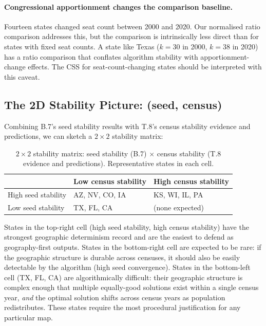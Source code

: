 \paragraph{Congressional apportionment changes the comparison baseline.}
Fourteen states changed seat count between 2000 and 2020.
Our normalised ratio comparison addresses this, but the comparison is
intrinsically less direct than for states with fixed seat counts.
A state like Texas ($k=30$ in 2000, $k=38$ in 2020) has a ratio comparison
that conflates algorithm stability with apportionment-change effects.
The CSS for seat-count-changing states should be interpreted with this caveat.

\subsection{The 2D Stability Picture: (seed, census)}

Combining B.7's seed stability results with T.8's census stability evidence and predictions,
we can sketch a $2\times 2$ stability matrix:

\begin{table}[h]
\centering
\caption{$2\times 2$ stability matrix: seed stability (B.7) $\times$ census
  stability (T.8 evidence and predictions). Representative states in each cell.}
\label{tab:2d-stability}
\begin{tabular}{l l l}
\toprule
                  & Low census stability & High census stability \\
\midrule
High seed stability & AZ, NV, CO, IA      & KS, WI, IL, PA \\
Low seed stability  & TX, FL, CA         & (none expected) \\
\bottomrule
\end{tabular}
\end{table}

States in the top-right cell (high seed stability, high census stability)
have the strongest geographic determinism record and are the easiest to defend
as geography-first outputs.
States in the bottom-right cell are expected to be rare:
if the geographic structure is durable across censuses, it should also be
easily detectable by the algorithm (high seed convergence).
States in the bottom-left cell (TX, FL, CA) are algorithmically difficult:
their geographic structure is complex enough that multiple equally-good
solutions exist within a single census year, \emph{and} the optimal solution
shifts across census years as population redistributes.
These states require the most procedural justification for any particular map.

